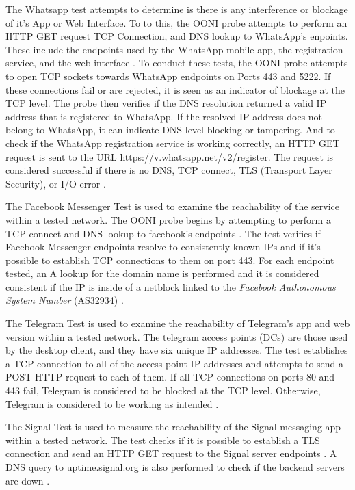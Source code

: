 The Whatsapp test attempts to determine is there is any interference or blockage of it's App or Web Interface. To to this, the OONI probe attempts to perform an HTTP GET request TCP Connection, and DNS lookup to WhatsApp's enpoints. These include the endpoints used by the WhatsApp mobile app, the registration service, and the web interface \cite{ooniWhatsAppTest}. To conduct these tests, the OONI probe attempts to open TCP sockets towards WhatsApp endpoints on Ports 443 and 5222. If these connections fail or are rejected, it is seen as an indicator of blockage at the TCP level. The probe then verifies if the DNS resolution returned a valid IP address that is registered to WhatsApp. If the resolved IP address does not belong to WhatsApp, it can indicate DNS level blocking or tampering. And to check if the WhatsApp registration service is working correctly, an HTTP GET request is sent to the URL \url{https://v.whatsapp.net/v2/register}. The request is considered successful if there is no DNS, TCP connect, TLS (Transport Layer Security), or I/O error \cite{WhatsAppTestGitHub}. 

The Facebook Messenger Test is used to examine the reachability of the service within a tested network. The OONI probe begins by attempting to perform a TCP connect and DNS lookup to facebook's endpoints \cite{ooniFacebookMessenger}. The test verifies if Facebook Messenger endpoints resolve to consistently known IPs and if it's possible to establish TCP connections to them on port 443. For each endpoint tested, an A lookup for the domain name is performed and it is considered consistent if the IP is inside of a netblock linked to the \textit{Facebook Authonomous System Number} (AS32934) \cite{FacebookTestGitHub}.

The Telegram Test is used to examine the reachability of Telegram's app and web version within a tested network. The telegram access points (DCs) are those used by the desktop client, and they have six unique IP addresses. The test establishes a TCP connection to all of the access point IP addresses and attempts to send a POST HTTP request to each of them. If all TCP connections on ports 80 and 443 fail, Telegram is considered to be blocked at the TCP level. Otherwise, Telegram is considered to be working as intended \cite{TelegramTestGitHub}. 

The Signal Test is used to measure the reachability of the Signal messaging app within a tested network. The test checks if it is possible to establish a TLS connection and send an HTTP GET request to the Signal server endpoints \cite{ooniSignalTest}. A DNS query to \url{uptime.signal.org} is also performed to check if the backend servers are down \cite{SignalTestGitHub}. 

